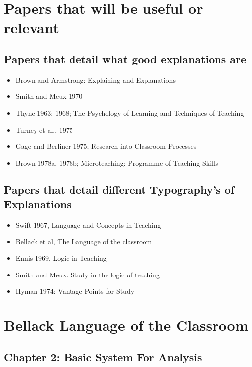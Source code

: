 \documentclass[10pt, letterpaper]{article}
\begin{document}
\section*{Papers that will be useful or relevant}
\label{sec:orgf36e1e5}

\subsection*{Papers that detail what good explanations are}
\label{sec:orgea73755}
\begin{itemize}
\item Brown and Armstrong: Explaining and Explanations \cite{brown1984explaining}
\item Smith and Meux 1970
\item Thyne 1963; 1968; The Psychology of Learning and Techniques of Teaching \cite{thyne1965psychology}
\item Turney et al., 1975
\item Gage and Berliner 1975; Research into Classroom Processes
\item Brown 1978a, 1978b; Microteaching: Programme of Teaching Skills \cite{10.2307/3120386}
\end{itemize}

\subsection*{Papers that detail different Typography's of Explanations}
\label{sec:org12c0699}
\begin{itemize}
\item Swift 1967, Language and Concepts in Teaching \cite{smith1967language}
\item Bellack et al, The Language of the classroom \cite{bellack1966language}
\item Ennis 1969, Logic in Teaching \cite{ennis1969logic}
\item Smith and Meux: Study in the logic of teaching \cite{Smith1970-SMIASO-13}
\item Hyman 1974: Vantage Points for Study \cite{hyman1968teaching}
\end{itemize}


\section*{Bellack Language of the Classroom}
\label{sec:org824b3d5}

\subsection*{Chapter 2: Basic System For Analysis}
\label{sec:org5a17417}
\end{document}
